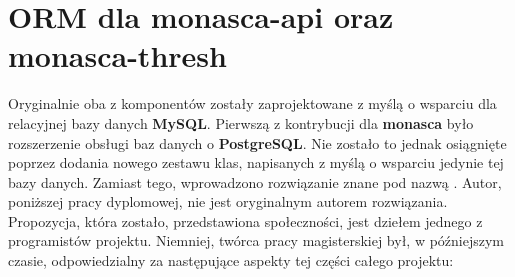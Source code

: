 \section{ORM dla monasca-api oraz monasca-thresh}
\label{chapter:application:own_work:orm}

Oryginalnie oba z komponentów zostały zaprojektowane z myślą o wsparciu dla relacyjnej bazy danych \textbf{MySQL}. 
Pierwszą z kontrybucji dla \textbf{monasca} było rozszerzenie obsługi baz danych o \textbf{PostgreSQL}. Nie zostało
to jednak osiągnięte poprzez dodania nowego zestawu klas, napisanych z myślą o wsparciu jedynie tej bazy danych. Zamiast
tego, wprowadzono rozwiązanie znane pod nazwą .
Autor, poniższej pracy dyplomowej, nie jest oryginalnym autorem rozwiązania. Propozycja, która zostało,
przedstawiona społeczności, jest dziełem jednego z programistów projektu. Niemniej, twórca pracy magisterskiej był, w późniejszym czasie,
odpowiedzialny za następujące aspekty tej części całego projektu:

